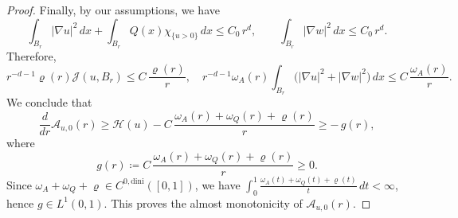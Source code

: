 \documentclass[10pt,a4paper]{amsart}
\begin{document}
\begin{proof}
Finally, by our assumptions, we have
\[
\int_{B_r}|\nabla u|^2\,dx + \int_{B_r}Q(x)\chi_{\{u>0\}}\,dx \le C_0\,r^{d},
\qquad
\int_{B_r}|\nabla w|^2\,dx \le C_0\,r^{d}.
\]
Therefore,
\[
r^{-d-1}\varrho(r)\mathcal J(u,B_r)\le C\,\frac{\varrho(r)}{r},
\quad
r^{-d-1}\omega_A(r)\!\int_{B_r}\big(|\nabla u|^2+|\nabla w|^2\big)\,dx \le C\,\frac{\omega_A(r)}{r}.
\]
We conclude that
\[
\frac{d}{dr}\mathcal A_{u,0}(r)
\ge \mathcal H(u) - C\,\frac{\omega_A(r)+\omega_Q(r)+\varrho(r)}{r}
\ge -\,g(r),
\]
where
\[
g(r)\coloneqq C\,\frac{\omega_A(r)+\omega_Q(r)+\varrho(r)}{r}\ge 0.
\]
Since $\omega_A+\omega_Q+\varrho\in C^{0,\mathrm{dini}}([0,1])$, we have $\int_0^1 \frac{\omega_A(t)+\omega_Q(t)+\varrho(t)}{t}\,dt<\infty$, hence $g\in L^1(0,1)$. This proves the almost monotonicity of $\mathcal A_{u,0}(r)$.
\end{proof}
\end{document}
